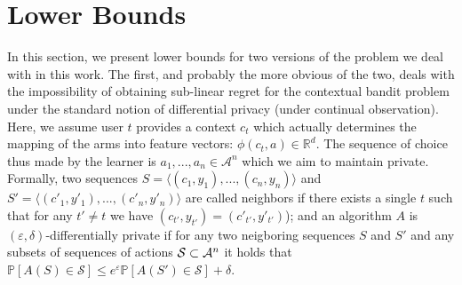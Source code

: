 \documentclass{article}
\newcommand{\Real}{\mathds{R}}
\renewcommand{\Pr}{\mathds{P}}
\newcommand{\Aset}[1]{\mathcal{A}_{#1}}
\begin{document}
\section{Lower Bounds}
\label{sec:lower_bounds}

In this section, we present lower bounds for two versions of the problem we deal with in this work. The first, and probably the more obvious of the two, deals with the impossibility of obtaining sub-linear regret for the contextual bandit problem under the standard notion of differential privacy (under continual observation). Here, we assume user $t$ provides a context $c_t$ which actually determines the mapping of the arms into feature vectors: $\phi(c_t, a) \in \Real^d$. The sequence of choice thus made by the learner is $a_1,..., a_n \in \Aset{}^n$ which we aim to maintain private. Formally, two sequences $S = \langle (c_1, y_1),..., (c_n,y_n)\rangle$ and $S' = \langle (c'_1, y'_1),..., (c'_n,y'_n)\rangle$ are called neighbors if there exists a single $t$ such that for any $t'\neq t$ we have $(c_{t'},y_{t'}) = (c'_{t'},y'_{t'})$); and an algorithm $A$ is $(\varepsilon,\delta)$-differentially private if for any two neigboring sequences $S$ and $S'$ and any subsets of sequences of actions ${\cal S}\subset \Aset{}^n$ it holds that $\Pr[A(S)\in\mathcal{S}] \leq e^\varepsilon \Pr[A(S')\in \mathcal{S}] +\delta$.
\end{document}
